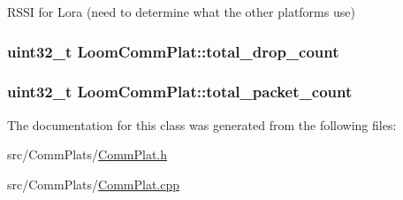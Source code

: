 R\+S\+SI for Lora (need to determine what the other platforms use) 

\subsubsection[{\texorpdfstring{total\+\_\+drop\+\_\+count}{total_drop_count}}]{\setlength{\rightskip}{0pt plus 5cm}uint32\+\_\+t Loom\+Comm\+Plat\+::total\+\_\+drop\+\_\+count\hspace{0.3cm}{\ttfamily [protected]}}\hypertarget{class_loom_comm_plat_a731d3f9f16e8a2647f0ef81e477ef2a7}{}\label{class_loom_comm_plat_a731d3f9f16e8a2647f0ef81e477ef2a7}
\subsubsection[{\texorpdfstring{total\+\_\+packet\+\_\+count}{total_packet_count}}]{\setlength{\rightskip}{0pt plus 5cm}uint32\+\_\+t Loom\+Comm\+Plat\+::total\+\_\+packet\+\_\+count\hspace{0.3cm}{\ttfamily [protected]}}\hypertarget{class_loom_comm_plat_afacaa3247078d09dd953371cfb929094}{}\label{class_loom_comm_plat_afacaa3247078d09dd953371cfb929094}


The documentation for this class was generated from the following files\+:\begin{DoxyCompactItemize}
\item 
src/\+Comm\+Plats/\hyperlink{_comm_plat_8h}{Comm\+Plat.\+h}\item 
src/\+Comm\+Plats/\hyperlink{_comm_plat_8cpp}{Comm\+Plat.\+cpp}\end{DoxyCompactItemize}

